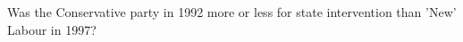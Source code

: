 \documentclass{mediumfoils}
\begin{document}
%
%
%
%
%
%





Was the Conservative party in 1992 more or less for state intervention than 'New' Labour in 
1997?
\end{document}
